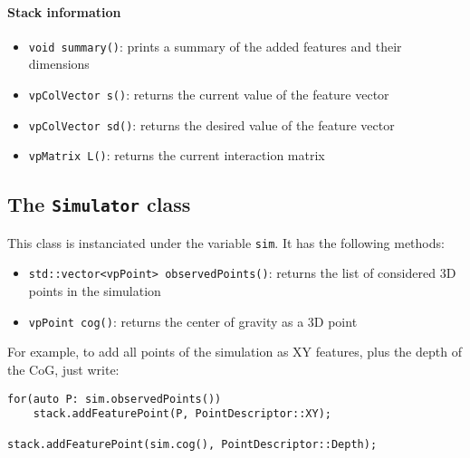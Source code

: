 \documentclass{ecnreport}
\begin{document}
\paragraph{Stack information}
\begin{itemize}
 \item  \texttt{void summary()}: prints a summary of the added features and their dimensions
 \item  \texttt{vpColVector s()}: returns the current value of the feature vector
  \item  \texttt{vpColVector sd()}: returns the desired value of the feature vector
   \item  \texttt{vpMatrix L()}: returns the current interaction matrix
 \end{itemize}


\subsection{The \texttt{Simulator} class}\label{app:sim}

This class is instanciated under the variable \texttt{sim}. It has the following methods:
\begin{itemize}
 \item \texttt{std::vector<vpPoint> observedPoints()}: returns the list of considered 3D points in the simulation
 \item \texttt{vpPoint cog()}: returns the center of gravity as a 3D point
\end{itemize}

For example, to add all points of the simulation as XY features, plus the depth of the CoG, just write:

\begin{center}\cppstyle
\begin{lstlisting}
for(auto P: sim.observedPoints())
    stack.addFeaturePoint(P, PointDescriptor::XY);
    
stack.addFeaturePoint(sim.cog(), PointDescriptor::Depth);
\end{lstlisting}
\end{center}
\end{document}

